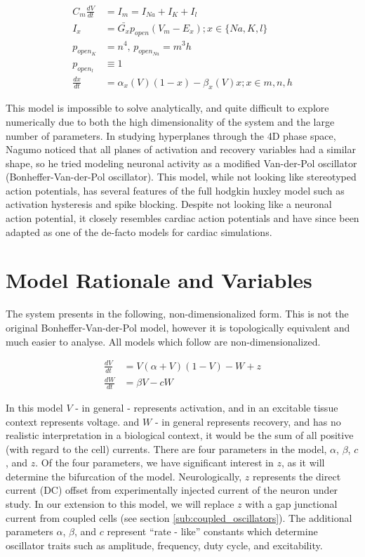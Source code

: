 \documentclass[11pt]{report}
\begin{document}
$$ \begin{aligned} C_m \frac{dV}{dt} &= I_m = I_{Na} + I_{K} + I_l \\ I_x &= \bar{G_x}p_{open}(V_m-E_x); x\in\{Na,K,l\}\\ p_{open_{K}} &= n^4, \, p_{open_{Na}} = m^3h\\ p_{open_{l}} &\equiv 1\\ \frac{dx}{dt} &= \alpha_x(V)(1-x)-\beta_x(V)x; x\in{m,n,h} \end{aligned} $$

This model is impossible to solve analytically, and quite difficult to explore numerically due to both the high dimensionality of the system and the large number of parameters. In studying hyperplanes through the 4D phase space, Nagumo noticed that all planes of activation and recovery variables had a similar shape, so he tried modeling neuronal activity as a modified Van-der-Pol oscillator (Bonheffer-Van-der-Pol oscillator). This model, while not looking like stereotyped action potentials, has several features of the full hodgkin huxley model such as activation hysteresis and spike blocking. Despite not looking like a neuronal action potential, it closely resembles cardiac action potentials and have since been adapted as one of the de-facto models for cardiac simulations. 


\section{Model Rationale and Variables}

The system presents in the following, non-dimensionalized form. This is not the original Bonheffer-Van-der-Pol model, however it is topologically equivalent and much easier to analyse. All models which follow are non-dimensionalized. 

$$ \begin{aligned} \frac{dV}{dt} &= V(\alpha+V)(1-V) -W + z \\
\frac{dW}{dt} &= \beta V-cW \end{aligned} $$

In this model $V$ - in general - represents activation, and in an excitable tissue context represents voltage. and $W$ - in general represents recovery, and has no realistic interpretation in a biological context, it would be the sum of all positive (with regard to the cell) currents. There are four parameters in the model, $\alpha$, $\beta$, $c$, and $z$. Of the four parameters, we have significant interest in $z$, as it will determine the bifurcation of the model. Neurologically, $z$ represents the direct current (DC) offset from experimentally injected current of the neuron under study. In our extension to this model, we will replace $z$ with a gap junctional current from coupled cells (see section \ref{sub:coupled_oscillators}). The additional parameters $\alpha$, $\beta$, and $c$ represent ``rate - like'' constants which determine oscillator traits such as amplitude, frequency, duty cycle, and excitability.
\end{document}
